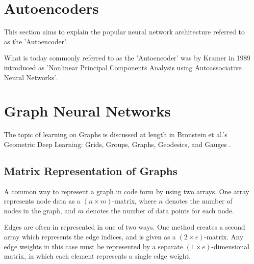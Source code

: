 \section{Autoencoders}

This section aims to explain the popular neural network architecture referred to as the 'Autoencoder'.


What is today commonly referred to as the 'Autoencoder' was by Kramer in 1989
introduced as 'Nonlinear Principal Components Analysis using Autoassociative Neural Networks'\cite{autoencoderOrigin}.














\section{Graph Neural Networks}
\label{section:gnn}

The topic of learning on Graphs is discussed at length in Bronstein et al.'s 
Geometric Deep Learning: Grids, Groups, Graphs, Geodesics, and Gauges \cite{geometricDeepLearningBlueprint}.

\subsection{Matrix Representation of Graphs}
A common way to represent a graph in code form by using two arrays. 
One array represents node data as a $(n\times m)$-matrix, where $ n $ denotes the number of 
nodes in the graph, and $ m $ denotes the number of data points for each node. 

Edges are often in represented in one of two ways.
One method creates a second array which represents the edge indices, 
and is given as a $ (2\times e) $-matrix. 
Any edge weights in this case must be represented by a separate $ (1\times e) $-dimensional matrix,
in which each element represents a single edge weight.

